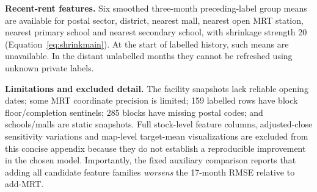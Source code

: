\documentclass[10pt,a4paper]{article}
\begin{document}
\textbf{Recent-rent features.} Six smoothed three-month preceding-label group means are available for postal sector, district, nearest mall, nearest open MRT station, nearest primary school and nearest secondary school, with shrinkage strength 20 (Equation~\eqref{eq:shrinkmain}). At the start of labelled history, such means are unavailable. In the distant unlabelled months they cannot be refreshed using unknown private labels.

\textbf{Limitations and excluded detail.} The facility snapshots lack reliable opening dates; some MRT coordinate precision is limited; 159 labelled rows have block floor/completion sentinels; 285 blocks have missing postal codes; and schools/malls are static snapshots. Full stock-level feature columns, adjusted-close sensitivity variations and map-level target-mean visualizations are excluded from this concise appendix because they do not establish a reproducible improvement in the chosen model. Importantly, the fixed auxiliary comparison reports that adding all candidate feature families \emph{worsens} the 17-month RMSE relative to add-MRT.
\end{document}
